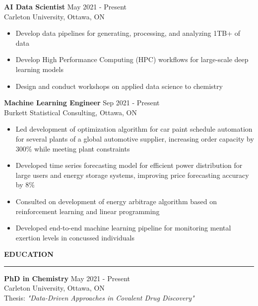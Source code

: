 \documentclass[11pt]{article}
\begin{document}
\textbf{AI Data Scientist} \hfill {\color{accentgray} May 2021 - Present}\\
{\color{accentgray} Carleton University, Ottawa, ON}\\[4pt]
\begin{itemize}[itemsep=0.1pt, topsep=0pt]
    \item Develop data pipelines for generating, processing, and analyzing 1TB+ of data
    \item Develop High Performance Computing (HPC) workflows for large-scale deep learning models
    \item Design and conduct workshops on applied data science to chemistry
\end{itemize}
\vspace*{0.15in}

\textbf{Machine Learning Engineer} \hfill {\color{accentgray} Sep 2021 - Present}\\
{\color{accentgray} Burkett Statistical Consulting, Ottawa, ON}\\[4pt]
\begin{itemize}[itemsep=0.1pt, topsep=0pt]
    \item Led development of optimization algorithm for car paint schedule automation for several plants of a global automotive supplier, increasing order capacity by 300\% while meeting plant constraints
    \item Developed time series forecasting model for efficient power distribution for large users and energy storage systems, improving price forecasting accuracy by 8\%
    \item Consulted on development of energy arbitrage algorithm based on reinforcement learning and linear programming
    \item Developed end-to-end machine learning pipeline for monitoring mental exertion levels in concussed individuals
\end{itemize}

\vspace*{0.1in}

{\color{headinggray}\textbf{\large EDUCATION}}\\[-10pt]
\noindent\textcolor{accentblue}{\rule{\textwidth}{1.5pt}}
\vspace*{-0.15in}

\textbf{PhD in Chemistry} \hfill {\color{accentgray} May 2021 - Present}\\
{\color{accentgray} Carleton University, Ottawa, ON}\\[4pt]
Thesis: \textit{"Data-Driven Approaches in Covalent Drug Discovery"}
\end{document}
